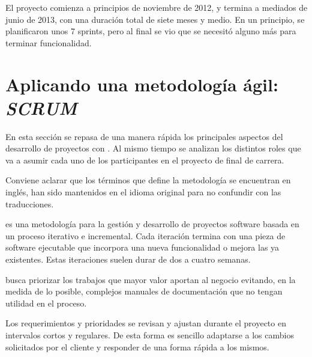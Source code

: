 El proyecto comienza a principios de noviembre de 2012, y termina a mediados de junio de
2013, con una duración total de siete meses y medio. En un principio, se planificaron unos 7 sprints, pero al final se vio que se necesitó alguno más para terminar funcionalidad.



\section{Aplicando una metodología ágil: \textit{SCRUM}}
En esta sección se repasa de una manera rápida los principales aspectos del desarrollo de proyectos con \scrum{}. Al mismo tiempo se analizan los distintos roles que va a asumir cada uno de los participantes en el proyecto de final de carrera.

Conviene aclarar que los términos que define la metodología \scrum {} se encuentran en inglés, han sido mantenidos en el idioma original para no confundir con las traducciones.

\scrum{} \cite{scrum} es una metodología para la gestión y desarrollo de proyectos software basada en un proceso iterativo e incremental. Cada iteración termina con una pieza de software ejecutable que incorpora una nueva funcionalidad o mejora las ya existentes. Estas iteraciones suelen durar de dos a cuatro semanas.

\scrum{} busca priorizar los trabajos que mayor valor aportan al negocio evitando, en la medida de lo posible, complejos manuales de documentación que no tengan utilidad en el proceso.

Los requerimientos y prioridades se revisan y ajustan durante el proyecto en intervalos cortos y regulares. De esta forma es sencillo adaptarse a los cambios solicitados por el cliente y responder de una forma rápida a los mismos.

